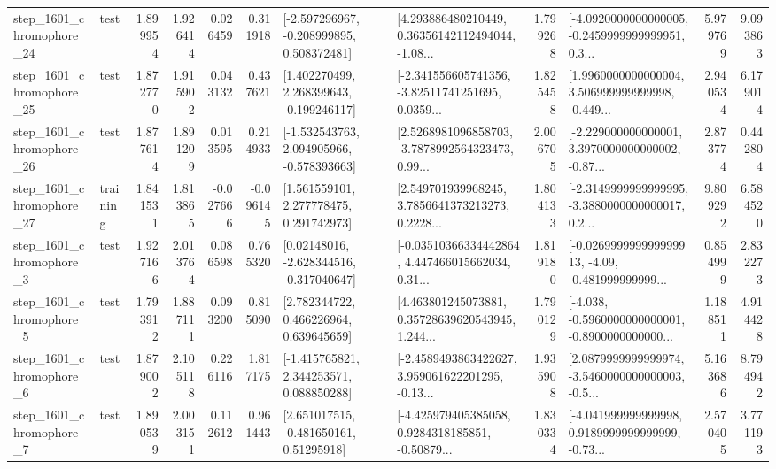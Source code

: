 \begin{tabular}{llrrrrllrlrr}
 step\_1601\_chromophore\_24 &      test &      1.899954 &    1.926414 &      0.026459 &  0.311918 &   [-2.597296967, -0.208999895, 0.508372481] &  [4.293886480210449, 0.36356142112494044, -1.08... &       1.799268 &  [-4.0920000000000005, -0.2459999999999951, 0.3... &            5.979769 &          9.093863 \\
 step\_1601\_chromophore\_25 &      test &      1.872770 &    1.915902 &      0.043132 &  0.437621 &    [1.402270499, 2.268399643, -0.199246117] &  [-2.341556605741356, -3.82511741251695, 0.0359... &       1.825458 &  [1.9960000000000004, 3.506999999999998, -0.449... &            2.940534 &          6.179014 \\
 step\_1601\_chromophore\_26 &      test &      1.877614 &    1.891209 &      0.013595 &  0.214933 &   [-1.532543763, 2.094905966, -0.578393663] &  [2.5268981096858703, -3.7878992564323473, 0.99... &       2.006705 &  [-2.229000000000001, 3.3970000000000002, -0.87... &            2.873774 &          0.442804 \\
 step\_1601\_chromophore\_27 &  training &      1.841531 &    1.813865 &     -0.027666 & -0.096145 &     [1.561559101, 2.277778475, 0.291742973] &  [2.549701939968245, 3.7856641373213273, 0.2228... &       1.804133 &  [-2.3149999999999995, -3.3880000000000017, 0.2... &            9.809292 &          6.584520 \\
  step\_1601\_chromophore\_3 &      test &      1.927166 &    2.013764 &      0.086598 &  0.765320 &    [0.02148016, -2.628344516, -0.317040647] &  [-0.03510366334442864, 4.447466015662034, 0.31... &       1.819180 &  [-0.026999999999999913, -4.09, -0.481999999999... &            0.854999 &          2.832273 \\
  step\_1601\_chromophore\_5 &      test &      1.793912 &    1.887111 &      0.093200 &  0.815090 &     [2.782344722, 0.466226964, 0.639645659] &  [4.463801245073881, 0.35728639620543945, 1.244... &       1.790129 &  [-4.038, -0.5960000000000001, -0.8900000000000... &            1.188511 &          4.914428 \\
  step\_1601\_chromophore\_6 &      test &      1.879002 &    2.105118 &      0.226116 &  1.817175 &    [-1.415765821, 2.344253571, 0.088850288] &  [-2.4589493863422627, 3.959061622201295, -0.13... &       1.935908 &  [2.0879999999999974, -3.5460000000000003, -0.5... &            5.163686 &          8.794942 \\
  step\_1601\_chromophore\_7 &      test &      1.890539 &    2.003151 &      0.112612 &  0.961443 &     [2.651017515, -0.481650161, 0.51295918] &  [-4.425979405385058, 0.9284318185851, -0.50879... &       1.830334 &  [-4.041999999999998, 0.9189999999999999, -0.73... &            2.570405 &          3.771193 \\

\end{tabular}
